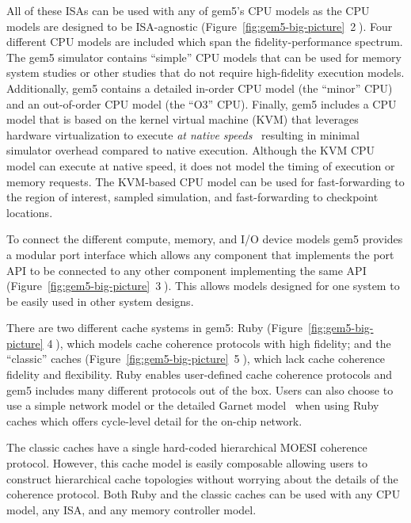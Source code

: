 All of these ISAs can be used with any of gem5's CPU models as the CPU models are designed to be ISA-agnostic (Figure~\ref{fig:gem5-big-picture}~\textcircled{2}).
Four different CPU models are included which span the fidelity-performance spectrum.
The gem5 simulator contains ``simple'' CPU models that can be used for memory system studies or other studies that do not require high-fidelity execution models.
Additionally, gem5 contains a detailed in-order CPU model (the ``minor'' CPU) and an out-of-order CPU model (the ``O3'' CPU).
Finally, gem5 includes a CPU model that is based on the kernel virtual machine (KVM) that leverages hardware virtualization to execute \emph{at native speeds}~\cite{full-speed-ahead} resulting in minimal simulator overhead compared to native execution.
Although the KVM CPU model can execute at native speed, it does not model the timing of execution or memory requests.
The KVM-based CPU model can be used for fast-forwarding to the region of interest, sampled simulation, and fast-forwarding to checkpoint locations.

To connect the different compute, memory, and I/O device models gem5 provides a modular port interface which allows any component that implements the port API to be connected to any other component implementing the same API (Figure~\ref{fig:gem5-big-picture}~\textcircled{3}).
This allows models designed for one system to be easily used in other system designs.

There are two different cache systems in gem5: Ruby (Figure~\ref{fig:gem5-big-picture} \textcircled{4}), which models cache coherence protocols with high fidelity; and the ``classic'' caches (Figure~\ref{fig:gem5-big-picture}~\textcircled{5}), which lack cache coherence fidelity and flexibility.
Ruby enables user-defined cache coherence protocols and gem5 includes many different protocols out of the box.
Users can also choose to use a simple network model or the detailed Garnet model~\cite{garnet-2} when using Ruby caches which offers cycle-level detail for the on-chip network.

The classic caches have a single hard-coded hierarchical MOESI coherence protocol.
However, this cache model is easily composable allowing users to construct hierarchical cache topologies without worrying about the details of the coherence protocol.
Both Ruby and the classic caches can be used with any CPU model, any ISA, and any memory controller model.

